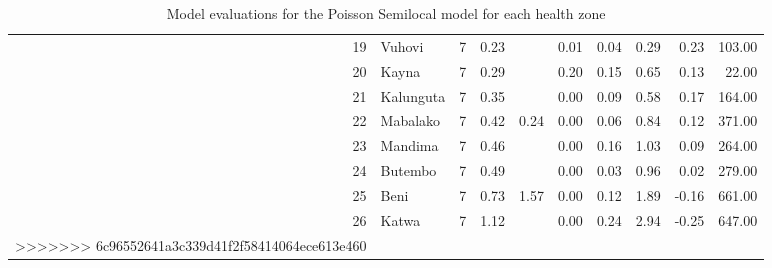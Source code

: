 \begin{table}[ht]
\begin{tabular}{rlrrrrrrrr}
  19 & Vuhovi &   7 & 0.23 &  & 0.01 & 0.04 & 0.29 & 0.23 & 103.00 \\ 
  20 & Kayna &   7 & 0.29 &  & 0.20 & 0.15 & 0.65 & 0.13 & 22.00 \\ 
  21 & Kalunguta &   7 & 0.35 &  & 0.00 & 0.09 & 0.58 & 0.17 & 164.00 \\ 
  22 & Mabalako &   7 & 0.42 & 0.24 & 0.00 & 0.06 & 0.84 & 0.12 & 371.00 \\ 
  23 & Mandima &   7 & 0.46 &  & 0.00 & 0.16 & 1.03 & 0.09 & 264.00 \\ 
  24 & Butembo &   7 & 0.49 &  & 0.00 & 0.03 & 0.96 & 0.02 & 279.00 \\ 
  25 & Beni &   7 & 0.73 & 1.57 & 0.00 & 0.12 & 1.89 & -0.16 & 661.00 \\ 
  26 & Katwa &   7 & 1.12 &  & 0.00 & 0.24 & 2.94 & -0.25 & 647.00 \\ 
>>>>>>> 6c96552641a3c339d41f2f58414064ece613e460
   \hline
\end{tabular}
\caption{Model evaluations for the Poisson Semilocal model for each health zone} 
\label{tab:by_hz_evo}
\end{table}
